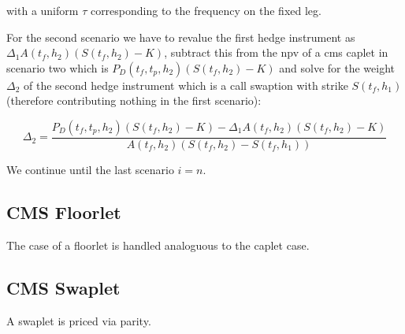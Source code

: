 \documentclass{amsart}
\theoremstyle{plain}
\numberwithin{equation}{section}
\begin{document}
with a uniform $\tau$ corresponding to the frequency on the fixed leg.

For the second scenario we have to revalue the first hedge instrument as $\Delta_1A(t_f,h_2)(S(t_f,h_2)-K)$, subtract this from the npv of a cms caplet in scenario two which is $P_D(t_f,t_p,h_2)(S(t_f,h_2)-K)$ and solve for the weight $\Delta_2$ of the second hedge instrument which is a call swaption with strike $S(t_f,h_1)$ (therefore contributing nothing in the first scenario):

\begin{equation}
\Delta_2 = \frac{P_D(t_f,t_p,h_2)(S(t_f,h_2)-K) - \Delta_1A(t_f,h_2)(S(t_f,h_2)-K)}{A(t_f,h_2)(S(t_f,h_2)-S(t_f,h_1))}
\end{equation} 

We continue until the last scenario $i=n$.

\subsection{CMS Floorlet}

The case of a floorlet is handled analoguous to the caplet case.

\subsection{CMS Swaplet}

A swaplet is priced via parity.
\end{document}
